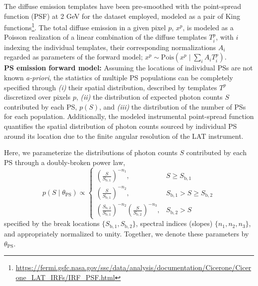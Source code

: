 \documentclass[prd,aps,10pt,nofootinbib,twocolumn,superscriptaddress,preprintnumbers,balancelastpage,longbibliography]{revtex4-1}
\begin{document}
The diffuse emission templates have been pre-smoothed with the \Fermi point-spread function (PSF) at 2 GeV for the dataset employed, modeled as a pair of King functions\footnote{\url{https://fermi.gsfc.nasa.gov/ssc/data/analysis/documentation/Cicerone/Cicerone_LAT_IRFs/IRF_PSF.html}}. The total diffuse emission in a given pixel $p$, $x^p$, is modeled as a Poisson realization of a linear combination of the diffuse templates $T^p_i$, with $i$ indexing the individual templates, their corresponding normalizations $A_i$ regarded as parameters of the forward model; $x^p \sim \mathrm{Pois}\left(x^p\mid\sum_i A_i T^p_i\right)$. \\ 

\noindent
\textbf{PS emission forward model:} Assuming the locations of individual PSs are not known \emph{a-priori}, the statistics of multiple PS populations can be completely specified through \emph{(i)} their spatial distribution, described by templates $T^p$ discretized over pixels $p$, \emph{(ii)} the distribution of expected photon counts $S$ contributed by each PS, $p(S)$, and \emph{(iii)} the distribution of the number of PSs for each population.  Additionally, the modeled instrumental point-spread function quantifies the spatial distribution of photon counts sourced by individual PS around its location due to the finite angular resolution of the LAT instrument.

Here, we parameterize the distributions of photon counts $S$ contributed by each PS through a doubly-broken power law,
\begin{equation}
\label{eq:scd_bpl}
p(S\mid\theta_\mathrm{PS})\propto \left\{\begin{array}{lc}
\left(\frac{S}{S_{\mathrm b, 1}}\right)^{-n_{1}}, & S \geq S_{\mathrm b, 1} \\
\left(\frac{S}{S_{\mathrm b, 1}}\right)^{-n_{2}}, & S_{\mathrm b, 1}>S \geq S_{\mathrm b, 2} \\
\left(\frac{S_{\mathrm b, 2}}{S_{\mathrm b, 1}}\right)^{-n_{2}}\left(\frac{S}{S_{\mathrm b, 2}}\right)^{-n_{3}}, & S_{\mathrm b, 2}>S
\end{array}\right.
\end{equation}
specified by the break locations $\{S_{\mathrm b, 1}, S_{\mathrm b, 2}\}$, spectral indices (slopes) $\{n_1, n_2, n_3\}$, and appropriately normalized to unity. Together, we denote these parameters by $\theta_\mathrm{PS}$.
\end{document}

